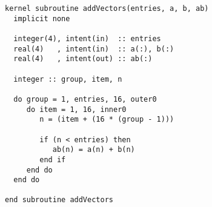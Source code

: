 \documentclass[12pt]{article}
\begin{document}
\vspace{4mm}
\begin{lstlisting}[caption={Adding two vectors using the \occa Fortran Language (\ofl)},label={lst:ofl_addVectors}]
kernel subroutine addVectors(entries, a, b, ab)
  implicit none

  integer(4), intent(in)  :: entries
  real(4)   , intent(in)  :: a(:), b(:)
  real(4)   , intent(out) :: ab(:)

  integer :: group, item, n

  do group = 1, entries, 16, outer0
     do item = 1, 16, inner0
        n = (item + (16 * (group - 1)))

        if (n < entries) then
           ab(n) = a(n) + b(n)
        end if
     end do
  end do

end subroutine addVectors
\end{lstlisting}
\end{document}

